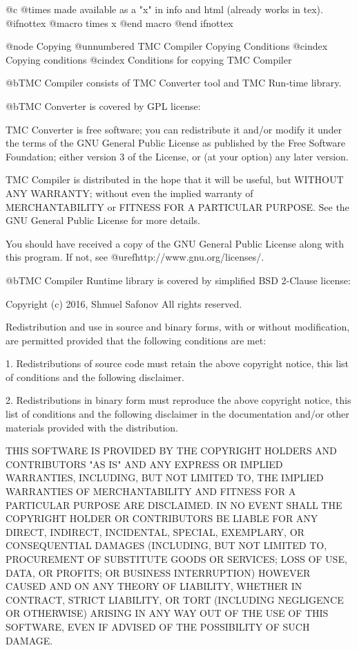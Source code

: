 @c  @times{} made available as a "x" in info and html  (already works in tex).
@ifnottex
@macro times
x
@end macro
@end ifnottex


@node Copying
@unnumbered TMC Compiler Copying Conditions
@cindex Copying conditions
@cindex Conditions for copying TMC Compiler

@b{TMC Compiler consists of TMC Converter tool and TMC Run-time library.}

@b{TMC Converter is covered by GPL license:}

TMC Converter is free software; you can redistribute it and/or modify it under
the terms of the GNU  General Public License as published by the
Free Software Foundation; either version 3 of the License, or (at your
option) any later version.

TMC Compiler is distributed in the hope that it will be useful, but WITHOUT ANY
WARRANTY; without even the implied warranty of MERCHANTABILITY or FITNESS
FOR A PARTICULAR PURPOSE. See the GNU General Public License for
more details.

You should have received a copy of the GNU General Public License
along with this program. If not, see @uref{http://www.gnu.org/licenses/}.


@b{TMC Compiler Runtime library is covered by simplified BSD 2-Clause license:}


Copyright (c) 2016, Shmuel Safonov
 All rights reserved.

Redistribution and use in source and binary forms, with or without modification, are permitted provided
that the following conditions are met:

1. Redistributions of source code must retain the above copyright notice, this list of conditions
 and the following disclaimer.

2. Redistributions in binary form must reproduce the above copyright notice,
 this list of conditions and the following disclaimer in the documentation and/or other materials
 provided with the distribution.

THIS SOFTWARE IS PROVIDED BY THE COPYRIGHT HOLDERS AND CONTRIBUTORS "AS IS"
 AND ANY EXPRESS OR IMPLIED WARRANTIES, INCLUDING, BUT NOT LIMITED TO,
 THE IMPLIED WARRANTIES OF MERCHANTABILITY AND FITNESS FOR A PARTICULAR
 PURPOSE ARE DISCLAIMED. IN NO EVENT SHALL THE COPYRIGHT HOLDER OR CONTRIBUTORS
 BE LIABLE FOR ANY DIRECT, INDIRECT, INCIDENTAL, SPECIAL, EXEMPLARY,
 OR CONSEQUENTIAL DAMAGES (INCLUDING, BUT NOT LIMITED TO, PROCUREMENT
 OF SUBSTITUTE GOODS OR SERVICES; LOSS OF USE, DATA, OR PROFITS; OR BUSINESS INTERRUPTION)
 HOWEVER CAUSED AND ON ANY THEORY OF LIABILITY,
 WHETHER IN CONTRACT, STRICT LIABILITY, OR TORT
 (INCLUDING NEGLIGENCE OR OTHERWISE) ARISING IN ANY WAY OUT OF THE USE OF THIS SOFTWARE,
 EVEN IF ADVISED OF THE POSSIBILITY OF SUCH DAMAGE.


